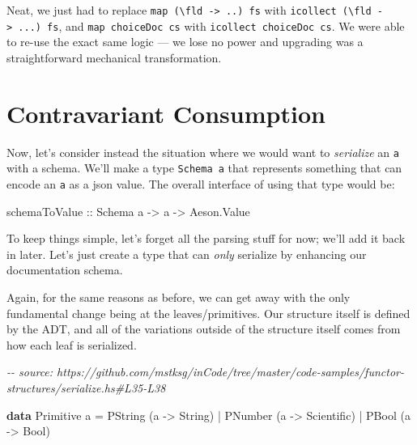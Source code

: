 \documentclass[]{article}
\newenvironment{Shaded}{}{}
\newcommand{\CommentTok}[1]{\textcolor[rgb]{0.38,0.63,0.69}{\textit{#1}}}
\newcommand{\DataTypeTok}[1]{\textcolor[rgb]{0.56,0.13,0.00}{#1}}
\newcommand{\KeywordTok}[1]{\textcolor[rgb]{0.00,0.44,0.13}{\textbf{#1}}}
\newcommand{\NormalTok}[1]{#1}
\newcommand{\OperatorTok}[1]{\textcolor[rgb]{0.40,0.40,0.40}{#1}}
\newcommand{\OtherTok}[1]{\textcolor[rgb]{0.00,0.44,0.13}{#1}}
\begin{document}
Neat, we just had to replace
\texttt{map\ (\textbackslash{}fld\ -\textgreater{}\ ..)\ fs} with
\texttt{icollect\ (\textbackslash{}fld\ -\textgreater{}\ ...)\ fs}, and
\texttt{map\ choiceDoc\ cs} with \texttt{icollect\ choiceDoc\ cs}. We were able
to re-use the exact same logic --- we lose no power and upgrading was a
straightforward mechanical transformation.

\hypertarget{contravariant-consumption}{%
\section{Contravariant Consumption}\label{contravariant-consumption}}

Now, let's consider instead the situation where we would want to
\emph{serialize} an \texttt{a} with a schema. We'll make a type
\texttt{Schema\ a} that represents something that can encode an \texttt{a} as a
json value. The overall interface of using that type would be:

\begin{Shaded}
\begin{Highlighting}[]
\OtherTok{schemaToValue ::} \DataTypeTok{Schema}\NormalTok{ a }\OtherTok{{-}>}\NormalTok{ a }\OtherTok{{-}>} \DataTypeTok{Aeson.Value}
\end{Highlighting}
\end{Shaded}

To keep things simple, let's forget all the parsing stuff for now; we'll add it
back in later. Let's just create a type that can \emph{only} serialize by
enhancing our documentation schema.

Again, for the same reasons as before, we can get away with the only fundamental
change being at the leaves/primitives. Our structure itself is defined by the
ADT, and all of the variations outside of the structure itself comes from how
each leaf is serialized.

\begin{Shaded}
\begin{Highlighting}[]
\CommentTok{{-}{-} source: https://github.com/mstksg/inCode/tree/master/code{-}samples/functor{-}structures/serialize.hs\#L35{-}L38}

\KeywordTok{data} \DataTypeTok{Primitive}\NormalTok{ a }\OtherTok{=}
      \DataTypeTok{PString}\NormalTok{ (a }\OtherTok{{-}>} \DataTypeTok{String}\NormalTok{)}
    \OperatorTok{|} \DataTypeTok{PNumber}\NormalTok{ (a }\OtherTok{{-}>} \DataTypeTok{Scientific}\NormalTok{)}
    \OperatorTok{|} \DataTypeTok{PBool}\NormalTok{   (a }\OtherTok{{-}>} \DataTypeTok{Bool}\NormalTok{)}
\end{Highlighting}
\end{Shaded}
\end{document}
